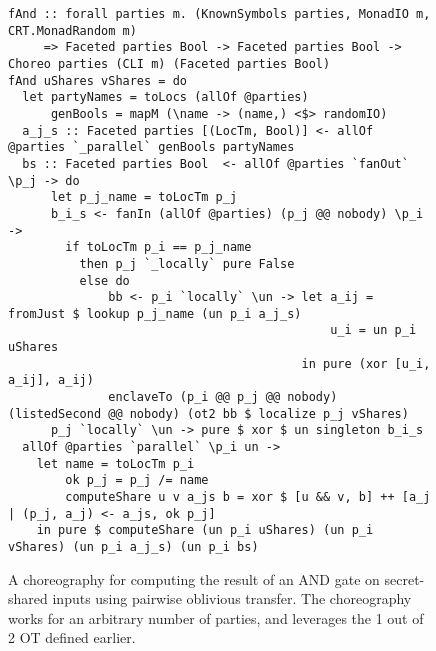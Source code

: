 \documentclass[sigplan,screen]{acmart}
\begin{document}
\begin{figure*}
\begin{mdframed}
\begin{verbatim}
fAnd :: forall parties m. (KnownSymbols parties, MonadIO m, CRT.MonadRandom m)
     => Faceted parties Bool -> Faceted parties Bool -> Choreo parties (CLI m) (Faceted parties Bool)
fAnd uShares vShares = do
  let partyNames = toLocs (allOf @parties)
      genBools = mapM (\name -> (name,) <$> randomIO)
  a_j_s :: Faceted parties [(LocTm, Bool)] <- allOf @parties `_parallel` genBools partyNames
  bs :: Faceted parties Bool  <- allOf @parties `fanOut` \p_j -> do
      let p_j_name = toLocTm p_j
      b_i_s <- fanIn (allOf @parties) (p_j @@ nobody) \p_i ->
        if toLocTm p_i == p_j_name
          then p_j `_locally` pure False
          else do
              bb <- p_i `locally` \un -> let a_ij = fromJust $ lookup p_j_name (un p_i a_j_s)
                                             u_i = un p_i uShares
                                         in pure (xor [u_i, a_ij], a_ij)
              enclaveTo (p_i @@ p_j @@ nobody) (listedSecond @@ nobody) (ot2 bb $ localize p_j vShares)
      p_j `locally` \un -> pure $ xor $ un singleton b_i_s
  allOf @parties `parallel` \p_i un ->
    let name = toLocTm p_i
        ok p_j = p_j /= name
        computeShare u v a_js b = xor $ [u && v, b] ++ [a_j | (p_j, a_j) <- a_js, ok p_j]
    in pure $ computeShare (un p_i uShares) (un p_i vShares) (un p_i a_j_s) (un p_i bs)
\end{verbatim}
\caption{A choreography for computing the result of an AND gate on secret-shared inputs using pairwise oblivious transfer. The choreography works for an arbitrary number of parties, and leverages the 1 out of 2 OT defined earlier.}
\label{fig:fand}
\end{mdframed}
\end{figure*}
\end{document}
